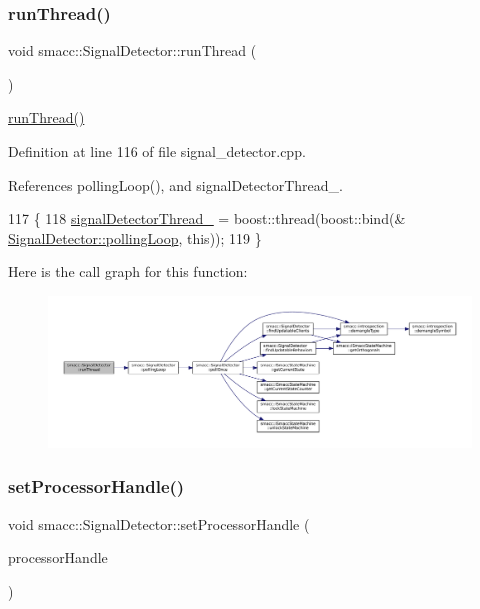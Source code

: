 \subsubsection{\texorpdfstring{run\+Thread()}{runThread()}}
{\footnotesize\ttfamily void smacc\+::\+Signal\+Detector\+::run\+Thread (\begin{DoxyParamCaption}{ }\end{DoxyParamCaption})}

\hyperlink{classsmacc_1_1SignalDetector_a48b3fee853ddcb25732408b22ecfcf39}{run\+Thread()} 

Definition at line 116 of file signal\+\_\+detector.\+cpp.



References polling\+Loop(), and signal\+Detector\+Thread\+\_\+.


\begin{DoxyCode}
117 \{
118     \hyperlink{classsmacc_1_1SignalDetector_a4346a400cd37eafc5d1d2e63d975785e}{signalDetectorThread\_} = boost::thread(boost::bind(&
      \hyperlink{classsmacc_1_1SignalDetector_a2665e66cdae9f6533c64bbcecf3fa199}{SignalDetector::pollingLoop}, \textcolor{keyword}{this}));
119 \}
\end{DoxyCode}
Here is the call graph for this function\+:
\nopagebreak
\begin{figure}[H]
\begin{center}
\leavevmode
\includegraphics[width=350pt]{classsmacc_1_1SignalDetector_a48b3fee853ddcb25732408b22ecfcf39_cgraph}
\end{center}
\end{figure}
\mbox{\label{classsmacc_1_1SignalDetector_ac1197a77c32a3b817005391e550ce646}} 
\subsubsection{\texorpdfstring{set\+Processor\+Handle()}{setProcessorHandle()}}
{\footnotesize\ttfamily void smacc\+::\+Signal\+Detector\+::set\+Processor\+Handle (\begin{DoxyParamCaption}\item[{Smacc\+Fifo\+Scheduler\+::processor\+\_\+handle}]{processor\+Handle }\end{DoxyParamCaption})}

